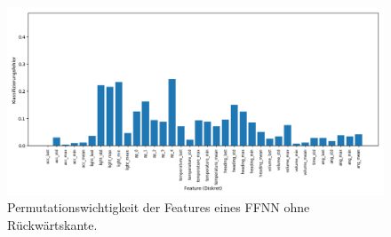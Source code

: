 \begin{figure}[h!]
    \centering
    \includegraphics[width=\linewidth]{images/fi_wo_fe_knn.png}
    \caption{Permutationswichtigkeit der Features eines FFNN ohne Rückwärtskante.}
    \label{fig:feature_significance_knn_wo_fe}
\end{figure}